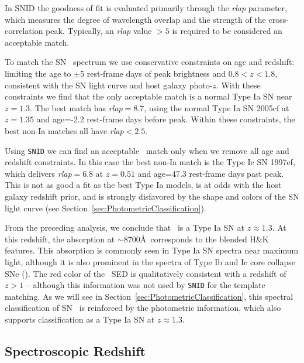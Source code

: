 In SNID the goodness of fit is evaluated primarily through the {\it
rlap} parameter, which measures the degree of wavelength overlap and
the strength of the cross-correlation peak.  Typically, an {\it rlap}
value $>5$ is required to be considered an acceptable match.  

To match the SN \tomas\ spectrum we use conservative constraints on
age and redshift: limiting the age to $\pm$5 rest-frame days of peak
brightness and $0.8<z<1.8$, consistent with the SN light curve and
host galaxy photo-$z$.  With these constraints we find that the only
acceptable match is a normal Type Ia SN near $z=1.3$. The best match
has {\it rlap}$=8.7$, using the normal Type Ia SN 2005cf at $z=1.35$
and age=-2.2 rest-frame days before peak.  Within these constraints,
the best non-Ia matches all have {\it rlap}$<2.5$.

Using {\tt SNID} we can find an acceptable \CCSN\ match only
when we remove all age and redshift constraints. In this case the best
non-Ia match is the Type Ic SN 1997ef, which delivers {\it rlap}$=6.8$
at $z=0.51$ and age=47.3 rest-frame days past peak.  This is not as
good a fit as the best Type Ia models, is at odds with the host galaxy
redshift prior, and is strongly disfavored by the shape and colors of
the SN light curve (see Section~\ref{sec:PhotometricClassification}).  

From the preceding analysis, we conclude that \tomas\ is a Type Ia SN
at $z\approx1.3$.  At this redshift, the absorption at $\sim$8700\AA\
corresponds to the blended  H\&K features.
This \ion{Ca}{2} absorption is commonly seen in Type Ia SN spectra
near maximum light, although it is also prominent in the spectra of
Type Ib and Ic core collapse SNe (\CCSNe).  The red color of
the \tomas\ SED is qualitatively consistent with a redshift of $z>1$
-- although this information was not used by {\tt SNID} for the
template matching.  As we will see in Section~\ref{sec:PhotometricClassification},
this spectral classification of SN \tomas\ is reinforced by the
photometric information, which also supports classification as a Type
Ia SN at $z\approx1.3$.


\subsection{Spectroscopic Redshift}
\label{sec:SpecRedshift}

